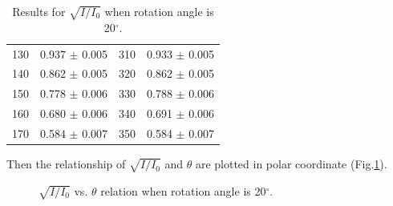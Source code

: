\documentclass[a4paper]{article}
\begin{document}
\begin{table}[H]
\begin{tabular}{cc||cc}
		130                                & 0.937    $\pm$ 0.005 & 310                                & 0.933   $\pm$ 0.005 \\
		140                                & 0.862    $\pm$ 0.005 & 320                                & 0.862   $\pm$ 0.005 \\
		150                                & 0.778    $\pm$ 0.006 & 330                                & 0.788   $\pm$ 0.006 \\
		160                                & 0.680    $\pm$ 0.006 & 340                                & 0.691   $\pm$ 0.006 \\
		170                                & 0.584    $\pm$ 0.007 & 350                                & 0.584   $\pm$ 0.007 \\
		\hline
	\end{tabular}
	\caption{Results for $\sqrt{I/I_0}$ when rotation angle is 20$^\circ$.}\label{TableSqrt20}
\end{table}

Then the relationship of $\sqrt{I/I_0}$ and $\theta$ are plotted in polar coordinate (Fig.\ref{fig::20degree}).

\begin{figure}[H]
	\centering
	\hspace{5mm}
	\hspace{5mm}
	\caption{$\sqrt{I/I_0}$ vs. $\theta$ relation when rotation angle is 20$^\circ$.}
	\label{fig::20degree}
\end{figure}
\end{document}
